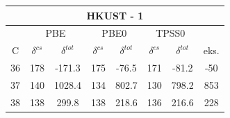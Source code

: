 \documentclass[openany, longbibliography,slovene,a4paper,12pt]{article}
\begin{document}
\begin{minipage}[]{1.0\linewidth}
  \centering 
  \begin{tabular}{|c ||c| c| c| c| c| c| c|}  \hline
    \multicolumn{8}{|c|}{HKUST - 1} \\ \hline
  & \multicolumn{2}{|c|}{PBE}   &  \multicolumn{2}{|c|}{PBE0}   & \multicolumn{2}{|c|}{TPSS0} &  \\ \hline
  C & $\delta^{cs} $ &  $\delta^{tot}$  & $\delta^{cs} $  &  $\delta^{tot}$  & $\delta^{cs} $  &  $\delta^{tot}$ & eks. \\ \hline
  36 & 178  & -171.3 & 175 & -76.5 & 171 & -81.2 & -50  \\ \hline
  37 & 140  & 1028.4 &  134 & 802.7 & 130 & 798.2 & 853   \\ \hline
  38 & 138  & 299.8 & 138 & 218.6 & 136 & 216.6 &  228  \\ \hline
 \end{tabular}
\end{minipage}

\newpage {}




\end{document}
